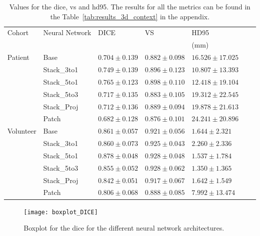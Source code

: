 \begin{table}[htbp]
   \centering
   \caption[Metrics for the different Architectures]{Values for the \acrlong{dice}, \acrlong{vs} and \acrlong{hd95}. The results for all the metrics can be found in the Table~\ref{tab:results_3d_context} in the appendix.}
   \begin{tabular}{l*{6}{l}}
      \toprule
      Cohort	& Neural Network	& DICE				& VS				& HD95\\
      			&					&					&					& (mm)\\
      \midrule
      Patient   & Base  & $0.704 \pm 0.139$ & $0.882 \pm 0.098$ & $16.526 \pm 17.025$ \\
                & Stack\_3to1  & $0.749 \pm 0.139$ & $0.896 \pm 0.123$ & $\mathbf{10.807 \pm 13.393}$ \\
                & Stack\_5to1  & $\mathbf{0.765 \pm 0.123}$ & $\mathbf{0.898 \pm 0.110}$ & $12.418 \pm 19.104$ \\
                & Stack\_5to3  & $0.717 \pm 0.135$ & $0.883 \pm 0.105$ & $19.312 \pm 22.545$ \\
                & Stack\_Proj  & $0.712 \pm 0.136$ & $0.889 \pm 0.094$ & $19.878 \pm 21.613$ \\
                & Patch & $0.682 \pm 0.128$ & $0.876 \pm 0.101$ & $24.241 \pm 20.896$ \\                
      \midrule
      Volunteer & Base  & $0.861 \pm 0.057$ & $0.921 \pm 0.056$ & $1.644  \pm 2.321 $ \\
                & Stack\_3to1  & $0.860 \pm 0.073$ & $0.925 \pm 0.043$ & $2.260  \pm 2.336 $ \\
                & Stack\_5to1  & $\mathbf{0.878 \pm 0.048}$ & $\mathbf{0.928 \pm 0.048}$ & $1.537  \pm 1.784 $ \\
                & Stack\_5to3  & $0.855 \pm 0.052$ & $0.928 \pm 0.062$ & $\mathbf{1.350  \pm 1.365} $ \\                
                & Stack\_Proj  & $0.842 \pm 0.051$ & $0.917 \pm 0.067$ & $1.642  \pm 1.549 $ \\
                & Patch & $0.806 \pm 0.068$ & $0.888 \pm 0.085$ & $7.992  \pm 13.474$ \\
      \bottomrule
   \end{tabular}
   \label{tab:results_3d_context_small}
\end{table}

\begin{figure}[htbp]
	\centering
	\texttt{[image: boxplot\_DICE]}
    \caption[Boxplot for the \acrlong{dice} of the different Architectures]{Boxplot for the \acrlong{dice} for the different neural network architectures.}
    \label{fig:results_boxplot_dice}
\end{figure}

